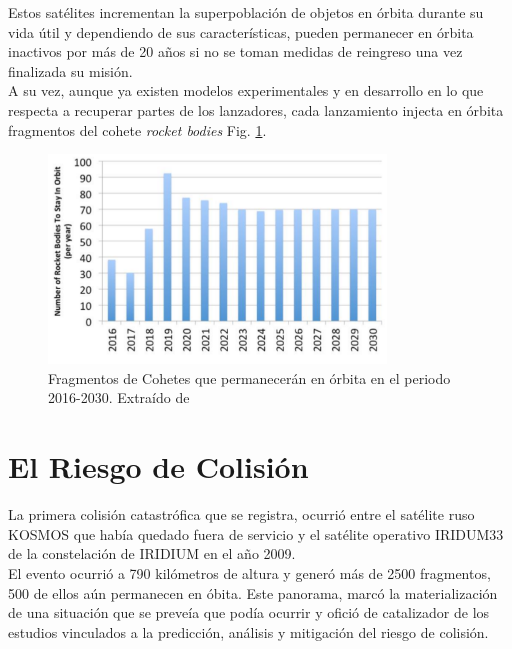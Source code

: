 Estos sat\'elites incrementan la superpoblaci\'on de objetos en \'orbita durante su vida \'util y dependiendo de sus caracter\'isticas, pueden permanecer en \'orbita inactivos por m\'as de 20 a\~nos si no se toman medidas de reingreso una vez finalizada su misi\'on.\\
A su vez, aunque ya existen modelos experimentales y en desarrollo en lo que respecta a recuperar partes de los lanzadores, cada lanzamiento injecta en \'orbita fragmentos del cohete {\it{rocket bodies}} Fig. \ref{fig:rocketbodies}.\\

\begin{figure}[!h]
  \centering
  \includegraphics[width=0.8\textwidth]{imagenes/rocketbodies}
  \caption[Fragmentos de Cohetes 2016-2030]{Fragmentos de Cohetes que permanecer\'an en \'orbita en el periodo 2016-2030. Extra\'ido de \cite{karacalioglu2016impact}}
  \label{fig:rocketbodies}
\end{figure}

\section{El Riesgo de Colisi\'on}

La primera colisi\'on catastr\'ofica que se registra, ocurri\'o entre el sat\'elite ruso KOSMOS  que hab\'ia quedado fuera de servicio y el sat\'elite operativo IRIDUM33 de la constelaci\'on de IRIDIUM en el a\~no 2009.\\
El evento ocurri\'o a 790 kil\'ometros de altura y gener\'o m\'as de 2500 fragmentos, 500 de ellos a\'un permanecen en \'obita. Este panorama, marc\'o la materializaci\'on de una situaci\'on que se preve\'ia que pod\'ia ocurrir y ofici\'o de catalizador de los estudios vinculados a la predicci\'on, an\'alisis y mitigaci\'on del riesgo de colisi\'on.\\

